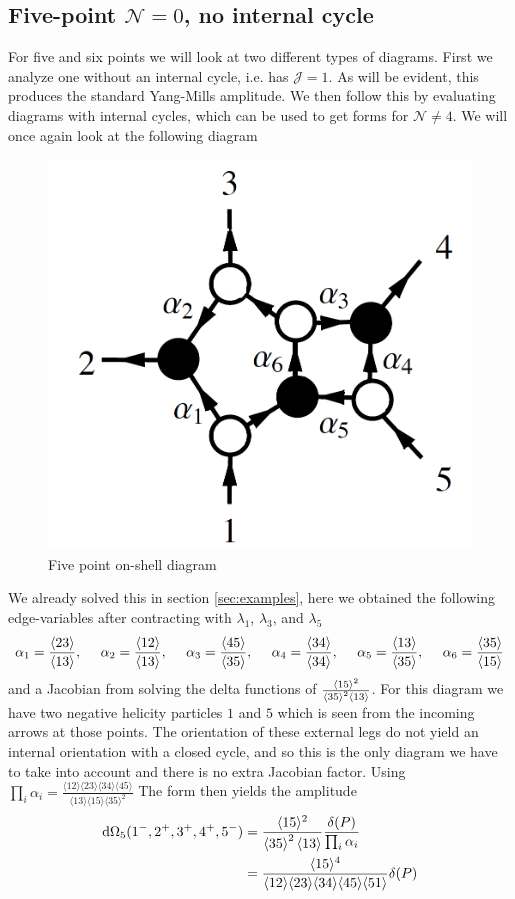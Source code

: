 \documentclass[letter,11pt]{article}
\newcommand{\ab}[1]{\langle #1 \rangle}
\begin{document}
\subsection{Five-point $\mathcal{N}=0$, no internal cycle}
For five and six points we will look at two different types of diagrams. First we analyze one without an internal cycle, i.e. has $\mathcal{J}=1$. As will be evident, this produces  the standard Yang-Mills amplitude. We then follow this by evaluating diagrams with internal cycles, which can be used to get forms for $\mathcal{N}\neq4$.
We will once again look at the following diagram
\begin{figure}[H]
	\centering
	\includegraphics[width=0.3\linewidth]{5pt}
	\caption{Five point on-shell diagram}
	\label{fig:5pt}
\end{figure}
We already solved this in section \ref{sec:examples}, here we obtained the following edge-variables after contracting with $\lambda_1$, $\lambda_3$, and $\lambda_5$
\begin{equation}
	\begin{aligned}
		\alpha_1=\frac{\expval{23}}{\expval{13}},~~~~
		\alpha_2=\frac{\expval{12}}{\expval{13}},~~~~
		\alpha_3=\frac{\expval{45}}{\expval{35}},~~~~
		\alpha_4=\frac{\expval{34}}{\expval{34}},~~~~
		\alpha_5=\frac{\expval{13}}{\expval{35}},~~~~
		\alpha_6=\frac{\expval{35}}{\expval{15}}
	\end{aligned}
\end{equation}
and a Jacobian from solving the delta functions of $\frac{\ab{15}^2}{\expval{35}^2\expval{13}}$. For this diagram we have two negative helicity particles $1$ and $5$ which is seen from the incoming arrows at those points. The orientation of these external legs do not yield an internal orientation with a closed cycle, and so this is the only diagram we have to take into account and there is no extra Jacobian factor. Using $\prod_{i}\alpha_i=\frac{\ab{12}\ab{23}\ab{34}\ab{45}}{\ab{13}\ab{15}\ab{35}^2}$ The form then yields the amplitude
\begin{equation}
	\begin{aligned}
		\dd \Omega_5(1^-,2^+,3^+,4^+,5^-)&=\frac{\ab{15}^2}{\expval{35}^2\expval{13}}\frac{\delta(P)}{\prod_i \alpha_i}\\
		&=\frac{\ab{15}^4}{\ab{12}\ab{23}\ab{34}\ab{45}\ab{51}}\delta(P)
	\end{aligned}
\end{equation}
\end{document}
